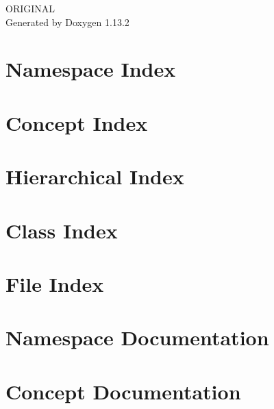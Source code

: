 \documentclass[twoside]{book}
\newcommand{\+}{\discretionary{\mbox{\scriptsize$\hookleftarrow$}}{}{}}
\newcommand{\clearemptydoublepage}{%
    \newpage{\pagestyle{empty}\cleardoublepage}%
  }
\begin{document}
  \raggedbottom
    \hypersetup{pageanchor=false,
                bookmarksnumbered=true,
                pdfencoding=unicode
               }
  \begin{titlepage}
  \vspace*{7cm}
  \begin{center}%
  {\Large ORIGINAL}\\
  \vspace*{1cm}
  {\large Generated by Doxygen 1.13.2}\\
  \end{center}
  \end{titlepage}
  \clearemptydoublepage
  \tableofcontents
  \clearemptydoublepage
  \hypersetup{pageanchor=true}

\chapter{Namespace Index}

\chapter{Concept Index}

\chapter{Hierarchical Index}

\chapter{Class Index}

\chapter{File Index}

\chapter{Namespace Documentation}

\chapter{Concept Documentation}







\end{document}

